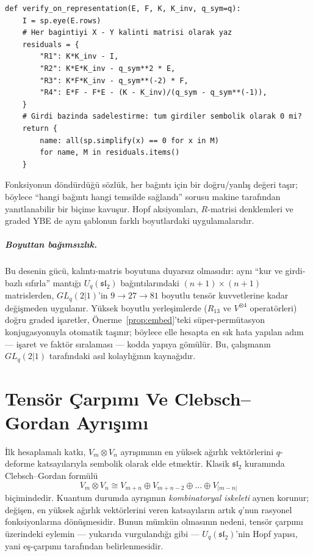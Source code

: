 \documentclass[12pt,a4paper,fleqn]{report}
\newcommand{\normalsemi}{;}
\newcommand{\normalsemi}{\begingroup\semicolonfont;\endgroup}
\numberwithin{equation}{chapter}
\theoremstyle{plain}
\theoremstyle{definition}
\renewcommand{\sl}{\mathfrak{sl}}
\newcommand{\Uq}{U_q(\sl_2)}
\begin{document}
\begin{lstlisting}[style=pyblock,caption={Tanımlayıcı Bağıntıların Sıfır-Kalıntı Yöntemiyle Doğrulanması}]
def verify_on_representation(E, F, K, K_inv, q_sym=q):
    I = sp.eye(E.rows)
    # Her bagintiyi X - Y kalinti matrisi olarak yaz
    residuals = {
        "R1": K*K_inv - I,
        "R2": K*E*K_inv - q_sym**2 * E,
        "R3": K*F*K_inv - q_sym**(-2) * F,
        "R4": E*F - F*E - (K - K_inv)/(q_sym - q_sym**(-1)),
    }
    # Girdi bazinda sadelestirme: tum girdiler sembolik olarak 0 mi?
    return {
        name: all(sp.simplify(x) == 0 for x in M)
        for name, M in residuals.items()
    }
\end{lstlisting}

Fonksiyonun döndürdüğü sözlük, her bağıntı için bir doğru/yanlış değeri taşır\normalsemi{}
böylece ``hangi bağıntı hangi temsilde sağlandı'' sorusu makine tarafından
yanıtlanabilir bir biçime kavuşur. Hopf aksiyomları, $R$-matrisi denklemleri ve
graded YBE de aynı şablonun farklı boyutlardaki uygulamalarıdır.

\paragraph{Boyuttan bağımsızlık.} Bu desenin gücü, kalıntı-matris boyutuna
duyarsız olmasıdır: aynı ``kur ve girdi-bazlı sıfırla'' mantığı $\Uq$
bağıntılarındaki $(n{+}1)\times(n{+}1)$ matrislerden, $GL_q(2|1)$'in
$9\to 27\to 81$ boyutlu tensör kuvvetlerine kadar değişmeden uygulanır. Yüksek
boyutlu yerleşimlerde ($R_{13}$ ve $V^{\otimes 4}$ operatörleri) doğru graded
işaretler, Önerme~\ref{prop:embed}'teki süper-permütasyon konjugasyonuyla
otomatik taşınır\normalsemi{} böylece elle hesapta en sık hata yapılan adım --- işaret ve
faktör sıralaması --- kodda yapıya gömülür. Bu, çalışmanın $GL_q(2|1)$
tarafındaki asıl kolaylığının kaynağıdır.

\chapter{Tensör Çarpımı Ve Clebsch--Gordan Ayrışımı}

İlk hesaplamalı katkı, $V_m \otimes V_n$ ayrışımının en yüksek ağırlık
vektörlerini $q$-deforme katsayılarıyla sembolik olarak elde etmektir. Klasik
$\sl_2$ kuramında Clebsch--Gordan formülü
\begin{equation}
  V_m \otimes V_n \cong V_{m+n} \oplus V_{m+n-2} \oplus \dots \oplus V_{|m-n|}
\end{equation}
biçimindedir. Kuantum durumda ayrışımın \emph{kombinatoryal iskeleti} aynen
korunur\normalsemi{} değişen, en yüksek ağırlık vektörlerini veren katsayıların artık
$q$'nun rasyonel fonksiyonlarına dönüşmesidir. Bunun mümkün olmasının nedeni,
tensör çarpımı üzerindeki eylemin --- yukarıda vurgulandığı gibi --- $\Uq$'nin
Hopf yapısı, yani eş-çarpımı tarafından belirlenmesidir.
\end{document}
